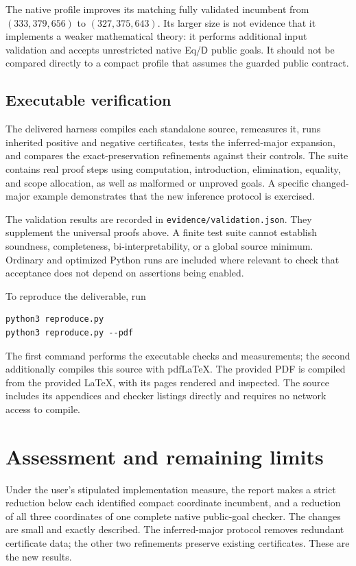 \documentclass[11pt,letterpaper]{article}
\theoremstyle{definition}
\newcommand{\D}{\mathsf D}
\begin{document}
The native profile improves its matching fully validated incumbent from
$(333,379,656)$ to $(327,375,643)$. Its larger size is not evidence that
it implements a weaker mathematical theory: it performs additional
input validation and accepts unrestricted native Eq/$\D$ public goals.
It should not be compared directly to a compact profile that assumes the
guarded public contract.

\subsection{Executable verification}

The delivered harness compiles each standalone source, remeasures it,
runs inherited positive and negative certificates, tests the inferred-major
expansion, and compares the exact-preservation refinements against their
controls. The suite contains real proof steps using computation,
introduction, elimination, equality, and scope allocation, as well as
malformed or unproved goals. A specific changed-major example demonstrates
that the new inference protocol is exercised.

The validation results are recorded in \texttt{evidence/validation.json}.
They supplement the universal proofs above. A finite test suite cannot
establish soundness, completeness, bi-interpretability, or a global source
minimum. Ordinary and optimized Python runs are included where relevant
to check that acceptance does not depend on assertions being enabled.

To reproduce the deliverable, run
\begin{lstlisting}
python3 reproduce.py
python3 reproduce.py --pdf
\end{lstlisting}
The first command performs the executable checks and measurements; the
second additionally compiles this source with pdfLaTeX. The provided PDF
is compiled from the provided LaTeX, with its pages rendered and inspected.
The source includes its appendices and checker listings directly and
requires no network access to compile.

\section{Assessment and remaining limits}

Under the user's stipulated implementation measure, the report makes a
strict reduction below each identified compact coordinate incumbent, and
a reduction of all three coordinates of one complete native public-goal
checker. The changes are small and exactly described. The inferred-major
protocol removes redundant certificate data; the other two refinements
preserve existing certificates. These are the new results.
\end{document}
